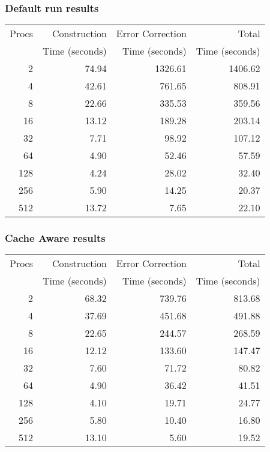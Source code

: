 \documentclass[integrals, nointegrals, article, 12pt, a4paper]{article}
\begin{document}
\subsubsection{Default run results}
\label{sec-3-2-2}

\begin{center}
\begin{tabular}{rrrr}
\hline
Procs & Construction & Error Correction & Total\\
 & Time (seconds) & Time (seconds) & Time (seconds)\\
\hline
2 & 74.94 & 1326.61 & 1406.62\\
4 & 42.61 & 761.65 & 808.91\\
8 & 22.66 & 335.53 & 359.56\\
16 & 13.12 & 189.28 & 203.14\\
32 & 7.71 & 98.92 & 107.12\\
64 & 4.90 & 52.46 & 57.59\\
128 & 4.24 & 28.02 & 32.40\\
256 & 5.90 & 14.25 & 20.37\\
512 & 13.72 & 7.65 & 22.10\\
\hline
\end{tabular}
\end{center}

\subsubsection{Cache Aware results}
\label{sec-3-2-3}

\begin{center}
\begin{tabular}{rrrr}
\hline
Procs & Construction & Error Correction & Total\\
 & Time (seconds) & Time (seconds) & Time (seconds)\\
\hline
2 & 68.32 & 739.76 & 813.68\\
4 & 37.69 & 451.68 & 491.88\\
8 & 22.65 & 244.57 & 268.59\\
16 & 12.12 & 133.60 & 147.47\\
32 & 7.60 & 71.72 & 80.82\\
64 & 4.90 & 36.42 & 41.51\\
128 & 4.10 & 19.71 & 24.77\\
256 & 5.80 & 10.40 & 16.80\\
512 & 13.10 & 5.60 & 19.52\\
\hline
\end{tabular}
\end{center}
\end{document}
